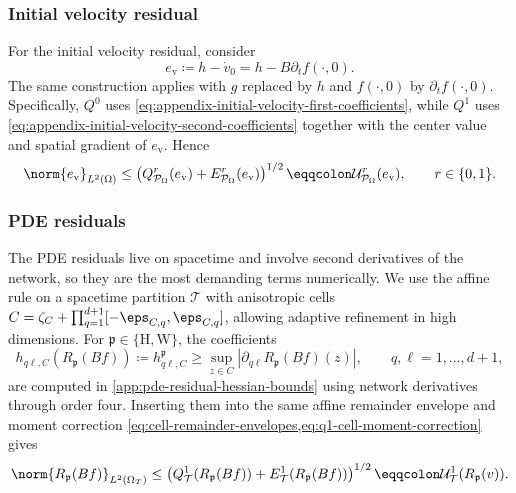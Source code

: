 \subsubsection{Initial velocity residual} \label{sec:initial-velocity-quad}

For the initial velocity residual, consider
\[
    e_{\mathrm v}\coloneqq h-\dot v_0
    =h-B\partial_t f(\cdot,0).
\]
The same construction applies with $g$ replaced by $h$ and $f(\cdot,0)$ by
$\partial_tf(\cdot,0)$.  Specifically, $Q^0$ uses
\eqref{eq:appendix-initial-velocity-first-coefficients}, while $Q^1$ uses
\eqref{eq:appendix-initial-velocity-second-coefficients} together with the
center value and spatial gradient of $e_{\mathrm v}$.  Hence
\begin{equation}\label{eq:initial-velocity-global-bound}
    \norm{e_{\mathrm v}}_{L^2(\Omega)}
    \leq
    \left(
        Q_{\mathcal P_\Omega}^r(e_{\mathrm v})
        +E_{\mathcal P_\Omega}^r(e_{\mathrm v})
    \right)^{1/2}
    \eqqcolon \mathcal U_{\mathcal P_\Omega}^r(e_{\mathrm v}),
    \qquad r\in\{0,1\}.
\end{equation}

\subsubsection{PDE residuals}\label{sec:pde-residual-quad}

The PDE residuals live on spacetime and involve second derivatives of the
network, so they are the most demanding terms numerically.  We use the affine
rule on a spacetime partition $\mathcal T$ with anisotropic cells
$C=\zeta_C+\prod_{q=1}^{d+1}[-\eps_{C,q},\eps_{C,q}]$, allowing adaptive
refinement in high dimensions.  For
$\mathfrak p\in\{\mathrm H,\mathrm W\}$, the coefficients
\begin{equation}\label{eq:pde-residual-second-coefficients}
 h_{q\ell,C}(R_{\mathfrak p}(Bf))
 \coloneqq h_{q\ell,C}^{\mathfrak p}
 \geq\sup_{z\in C}|\partial_{q\ell}R_{\mathfrak p}(Bf)(z)|,
 \qquad q,\ell=1,\dots,d+1,
\end{equation}
are computed in \cref{app:pde-residual-hessian-bounds} using network
derivatives through order four.  Inserting them into the same affine
remainder envelope and moment correction
\cref{eq:cell-remainder-envelopes,eq:q1-cell-moment-correction} gives
\begin{equation}\label{eq:pde-global-bound}
 \norm{R_{\mathfrak p}(Bf)}_{L^2(\Omega_T)}
 \leq
 \left(Q_{\mathcal T}^1(R_{\mathfrak p}(Bf))
 +E_{\mathcal T}^1(R_{\mathfrak p}(Bf))\right)^{1/2}
 \eqqcolon\mathcal U_{\mathcal T}^1(R_{\mathfrak p}(v)).
\end{equation}


